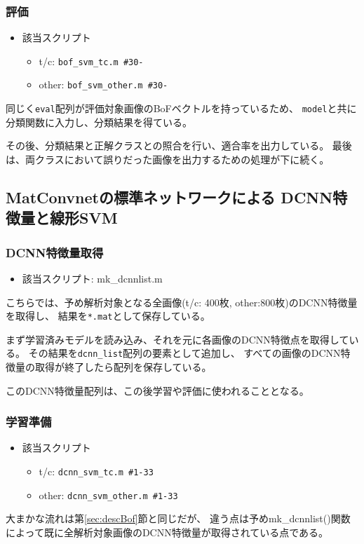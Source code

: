 \documentclass[11pt,a4paper, uplatex]{jsreport}
\begin{document}
\subsubsection{評価}
\begin{itemize}
  \item 該当スクリプト
  \begin{itemize}
    \item t/c: \texttt{bof_svm_tc.m \#30-}
    \item other: \texttt{bof_svm_other.m \#30-}
  \end{itemize}
\end{itemize}
同じく\texttt{eval}配列が評価対象画像のBoFベクトルを持っているため、
\texttt{model}と共に分類関数に入力し、分類結果を得ている。

その後、分類結果と正解クラスとの照合を行い、適合率を出力している。
最後は、両クラスにおいて誤りだった画像を出力するための処理が下に続く。
\subsection{MatConvnetの標準ネットワークによる DCNN特徴量と線形SVM}\label{sec:descDcnn}
\subsubsection{DCNN特徴量取得}
\begin{itemize}
  \item 該当スクリプト: mk_dcnnlist.m
\end{itemize}
こちらでは、予め解析対象となる全画像(t/c: 400枚, other:800枚)のDCNN特徴量を取得し、
結果を\texttt{*.mat}として保存している。

まず学習済みモデルを読み込み、それを元に各画像のDCNN特徴点を取得している。
その結果を\texttt{dcnn_list}配列の要素として追加し、
すべての画像のDCNN特徴量の取得が終了したら配列を保存している。

このDCNN特徴量配列は、この後学習や評価に使われることとなる。

\subsubsection{学習準備}
\begin{itemize}
  \item 該当スクリプト
  \begin{itemize}
    \item t/c: \texttt{dcnn_svm_tc.m \#1-33}
    \item other: \texttt{dcnn_svm_other.m \#1-33}
  \end{itemize}
\end{itemize}
大まかな流れは第\ref{sec:descBof}節と同じだが、
違う点は予めmk_dcnnlist()関数によって既に全解析対象画像のDCNN特徴量が取得されている点である。
\end{document}
